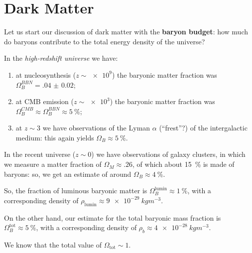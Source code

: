 \documentclass[main.tex]{subfiles}
\begin{document}
\section{Dark Matter}


Let us start our discussion of dark matter with the \textbf{baryon budget}: how much do baryons contribute to the total energy density of the universe?

In the \emph{high-redshift universe} we have: 
\begin{enumerate}
    \item at nucleosynthesis (\(z \sim \num{e9}\)) the baryonic matter fraction was \(\Omega_{B}^{BBN} = \num{.04(2)}\); 
    \item at CMB emission (\(z \sim \num{e3}\)) the baryonic matter fraction was \(\Omega_{B}^{CMB} \approx \Omega_{B}^{BBN} \approx \SI{5}{\percent}\);
    \item at \(z \sim 3\) we have observations of the Lyman \(\alpha \) (``frest''?) of the intergalactic medium: this again yields \(\Omega_{B} \approx \SI{5}{\percent}\).
\end{enumerate}


In the recent universe (\(z \sim 0\)) we have observations of galaxy clusters, in which we measure a matter fraction of \(\Omega_{M} \approx \num{.26}\), of which about \SI{15}{\percent} is made of baryons: so, we get an estimate of around \(\Omega_{B} \approx \SI{4}{\percent}\). 

So, the fraction of luminous baryonic matter is \(\Omega_{B}^{\text{lumin}} \approx \SI{1}{\percent}\), with a corresponding density of \(\rho _{\text{lumin}} \approx \SI{9e-29}{kg m^{-3}}\). 

On the other hand, our estimate for the total baryonic mass fraction is \(\Omega_{B}^{\text{tot}} \approx \SI{5}{\percent}\), with a corresponding density of \(\rho_{b} \approx \SI{4e-28}{kg m^{-3}}\).

We know that the total value of \(\Omega _{\text{tot}}  \sim 1\). 
\end{document}
